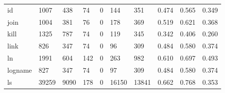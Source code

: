 \begin{longtable}{lp{2.0cm}p{2.0cm}p{2.0cm}p{2.0cm}p{2.0cm}p{2.0cm}p{2.0cm}p{2.0cm}p{2.0cm}}
id        &                   1007 &                                438 &                                74 &                                0 &                               144 &                             351 &                                   0.474 &                                  0.565 &                                0.349 \\
join      &                   1004 &                                381 &                                76 &                                0 &                               178 &                             369 &                                   0.519 &                                  0.621 &                                0.368 \\
kill      &                   1325 &                                787 &                                74 &                                0 &                               119 &                             345 &                                   0.342 &                                  0.406 &                                0.260 \\
link      &                    826 &                                347 &                                74 &                                0 &                                96 &                             309 &                                   0.484 &                                  0.580 &                                0.374 \\
ln        &                   1991 &                                604 &                               142 &                                0 &                               263 &                             982 &                                   0.610 &                                  0.697 &                                0.493 \\
logname   &                    827 &                                347 &                                74 &                                0 &                                97 &                             309 &                                   0.484 &                                  0.580 &                                0.374 \\
ls        &                  39259 &                               9090 &                               178 &                                0 &                             16150 &                           13841 &                                   0.662 &                                  0.768 &                                0.353 \\

\end{longtable}
